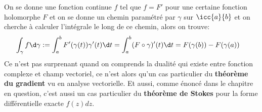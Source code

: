 \subsection*{}
On se donne une fonction continue \(f\) tel que \(f =  F'\) pour une certaine fonction holomorphe \(F\) et on se donne un chemin paramétré par \(\gamma\) sur \(\icc{a}{b}\) et on cherche à calculer l'intégrale le long de ce chemin, alors on trouve:
\begin{align*}
   \int_{\gamma} f \d \gamma &:= \int_{a}^{b} F'(\gamma(t))\gamma'(t)\d t = \int_{a}^{b} (F \circ \gamma)'(t) \d t = F(\gamma(b)) - F(\gamma(a))
\end{align*}
Ce n'est pas surprenant quand on comprends la dualité qui existe entre fonction complexe et champ vectoriel, ce n'est alors qu'un cas particulier du \textbf{théorème du gradient} vu en analyse vectorielle. Et aussi, comme énoncé dans le chapitre en question, c'est aussi un cas particulier du \textbf{théorème de Stokes} pour la forme différentielle exacte \(f(z)dz\).


\chapter*{} %


\chapter*{} %
